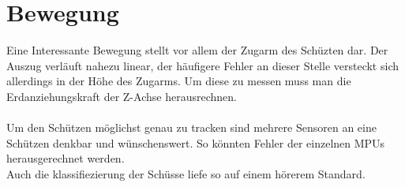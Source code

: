 \section {Bewegung}
Eine Interessante Bewegung stellt vor allem der Zugarm des 
Schüzten dar. Der Auszug verläuft nahezu linear, der häufigere Fehler 
an dieser Stelle versteckt sich allerdings in der Höhe des Zugarms. 
Um diese zu messen muss man die Erdanziehungskraft der Z-Achse herausrechnen.\\
\\
Um den Schützen möglichst genau zu tracken sind mehrere Sensoren an eine Schützen denkbar und
wünschenswert. So könnten Fehler der einzelnen MPUs herausgerechnet werden.\\
Auch die klassifiezierung der Schüsse liefe so auf einem hörerem Standard.
\\




